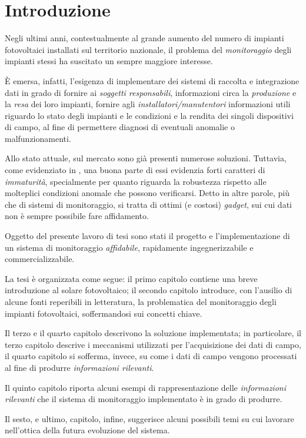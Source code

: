 \clearpage{\pagestyle{empty}\cleardoublepage}
\chapter*{Introduzione} 
%
Negli ultimi anni, contestualmente al grande aumento del 
numero di impianti fotovoltaici installati sul territorio 
nazionale\cite{gse2010}, il problema del \emph{monitoraggio} 
degli impianti stessi ha suscitato un sempre maggiore 
interesse.
%

%
\`E emersa, infatti, l'esigenza di implementare dei sistemi 
di raccolta e integrazione dati in grado di  fornire ai 
\emph{soggetti responsabili}, informazioni circa la 
\emph{produzione} e la \emph{resa} dei loro impianti, 
 fornire agli \emph{installatori/manutentori} informazioni 
utili riguardo lo stato degli impianti e le condizioni e la 
rendita dei singoli dispositivi di campo, al fine di permettere 
diagnosi di eventuali anomalie o malfunzionamenti.
%

%
Allo stato attuale, sul mercato sono gi\`a presenti numerose 
soluzioni. Tuttavia, come evidenziato in \cite{photon2010}, una 
buona parte di essi evidenzia forti caratteri di \emph{immaturit\`a}, 
specialmente per quanto riguarda la robustezza rispetto alle 
molteplici condizioni anomale che possono verificarsi.
%
Detto in altre parole, pi\`u che di sistemi di monitoraggio, 
si tratta di ottimi (e costosi) \emph{gadget}, sui cui dati 
non \`e sempre possibile fare affidamento. 
%

%
Oggetto del presente lavoro di tesi sono stati il progetto e l'implementazione 
di un sistema di monitoraggio \emph{affidabile}, rapidamente ingegnerizzabile 
e commercializzabile.
%

%
La tesi \`e organizzata come segue: il primo capitolo contiene una breve 
introduzione al solare fotovoltaico; il secondo capitolo introduce, con l'ausilio 
di alcune fonti reperibili in letteratura, la problematica del monitoraggio degli 
impianti fotovoltaici, soffermandosi sui concetti chiave.
%

%
Il terzo e il quarto capitolo descrivono la soluzione implementata; in particolare, 
il terzo capitolo descrive i meccanismi utilizzati per l'acquisizione dei dati di campo,
il quarto capitolo si sofferma, invece, su come i dati di campo vengono processati 
al fine di produrre \emph{informazioni rilevanti}.
%

%
Il quinto capitolo riporta alcuni esempi di rappresentazione delle \emph{informazioni rilevanti}
che il sistema di monitoraggio implementato \`e in grado di produrre.
%

%
Il sesto, e ultimo, capitolo, infine, suggerisce alcuni possibili temi su cui lavorare
nell'ottica della futura evoluzione del sistema.
%
